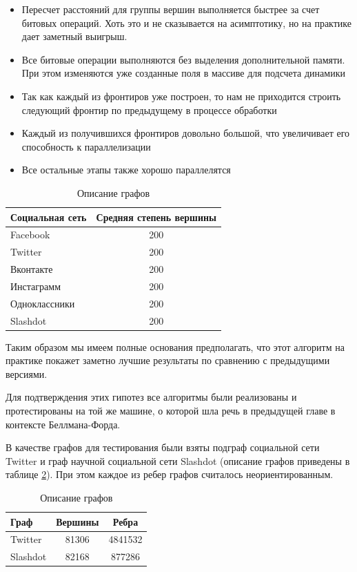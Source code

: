 \begin{itemize}
  \item Пересчет расстояний для группы вершин выполняется быстрее за счет битовых операций. Хоть это и не сказывается на асимптотику, но на практике дает заметный выигрыш. 
  \item Все битовые операции выполняются без выделения дополнительной памяти. При этом изменяются уже созданные поля в массиве для подсчета динамики
  \item Так как каждый из фронтиров уже построен, то нам не приходится строить следующий фронтир по предыдущему в процессе обработки
  \item Каждый из получившихся фронтиров довольно большой, что увеличивает его способность к параллелизации
  \item Все остальные этапы также хорошо параллелятся
\end{itemize}

\begin{table}[H]
\centering

\begin{tabular}{l|c}  
Социальная сеть & Средняя степень вершины\\
\hline\hline
Facebook & 200 \\  
Twitter & 200  \\
Вконтакте & 200  \\
Инстаграмм & 200  \\
Одноклассники & 200  \\
Slashdot & 200  \\
\hline
\end{tabular}
\caption{Описание графов}
\label {table:algo_floyd_avg_vertex_degree}
\end{table}

Таким образом мы имеем полные основания предполагать, что этот алгоритм на практике покажет заметно лучшие результаты по сравнению с предыдущими версиями. 

Для подтверждения этих гипотез все алгоритмы были реализованы и протестированы на той же машине, о которой шла речь в предыдущей главе в контексте Беллмана-Форда.

В качестве графов для тестирования были взяты подграф социальной сети Twitter и граф научной социальной сети Slashdot (описание графов приведены в таблице \ref{table:algo_floyd_graph_description}). При этом каждое из ребер графов считалось неориентированным. \FloatBarrier
\begin{table}[H]
\centering

\begin{tabular}{l|c|c}  
Граф & Вершины & Ребра\\
\hline\hline
Twitter & 81306 & 4841532\\  
Slashdot & 82168 & 877286  \\
\hline
\end{tabular}

\caption{Описание графов}
\label {table:algo_floyd_graph_description}
\end{table}

